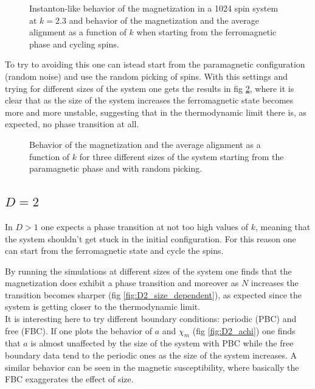\documentclass[a4paper, 11pt]{article}
\begin{document}
      \begin{figure}[H]
        \centering
        \caption{Instanton-like behavior of the magnetization in a 1024 spin system at $k = 2.3$ and behavior of the magnetization and the average alignment as a function of $k$ when starting from the ferromagnetic phase and cycling spins.}
        \label{fig:instanton}
      \end{figure}

      To try to avoiding this one can istead start from the paramagnetic configuration (random noise) and use the random picking of spins. With this settings and trying for different sizes of the system one gets the results in fig \ref{fig:D1_size_dependent}, where it is clear that as the size of the system increases the ferromagnetic state becomes more and more unstable, suggesting that in the thermodynamic limit there is, as expected, no phase transition at all.

      \begin{figure}[H]
        \centering
        \caption{Behavior of the magnetization and the average alignment as a function of $k$ for three different sizes of the system starting from the paramagnetic phase and with random picking.}
        \label{fig:D1_size_dependent}
      \end{figure}


    \subsection{$D = 2$}
      In $D > 1$ one expects a phase transition at not too high values of $k$, meaning that the system shouldn't get stuck in the initial configuration. For this reason one can start from the ferromagnetic state and cycle the spins.

      By running the simulations at different sizes of the system one finds that the magnetization does exhibit a phase transition and moreover as $N$ increases the transition becomes sharper (fig \ref{fig:D2_size_dependent}), as expected since the system is getting closer to the thermodynamic limit.\\
      It is interesting here to try different boundary conditions: periodic (PBC) and free (FBC).
      If one plots the behavior of $a$ and $\chi_m$ (fig \ref{fig:D2_achi}) one finds that $a$ is almost unaffected by the size of the system with PBC while the free boundary data tend to the periodic ones as the size of the system increases. A similar behavior can be seen in the magnetic susceptibility, where basically the FBC exaggerates the effect of size.
\end{document}
